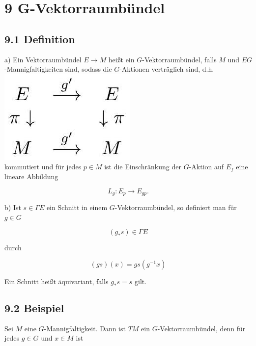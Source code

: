 \documentclass[10pt, letterpaper]{article}
\begin{document}
\pagebreak

\section{9 G-Vektorraumbündel}
\subsection*{9.1 Definition}
a) Ein Vektorraumbündel $E \rightarrow M$ heißt ein $G$-Vektorraumbündel, falls $M$ und $E G$-Mannigfaltigkeiten sind, sodass die $G$-Aktionen verträglich sind, d.h.\\
\includegraphics[max width=\textwidth, center]{2025_05_20_67e75debbfd3ba8ea587g-51}\\
kommutiert und für jedes $p \in M$ ist die Einschränkung der $G$-Aktion auf $E_{f}$ eine lineare Abbildung

$$
L_{g}: E_{p} \rightarrow E_{g p} .
$$

b) Ist $s \in \Gamma E$ ein Schnitt in einem $G$-Vektorraumbündel, so definiert man für $g \in G$

$$
\left(g_{*} s\right) \in \Gamma E
$$

durch

$$
(g s)(x)=g s\left(g^{-1} x\right)
$$

Ein Schnitt heißt äquivariant, falls $g_{*} s=s$ gilt.

\subsection*{9.2 Beispiel}
Sei $M$ eine $G$-Mannigfaltigkeit. Dann ist $T M$ ein $G$-Vektorraumbündel, denn für jedes $g \in G$ und $x \in M$ ist
\end{document}
